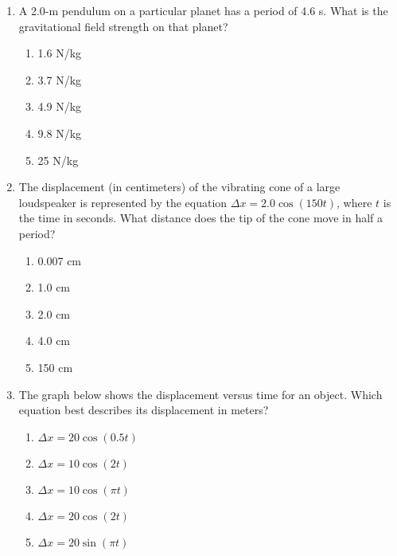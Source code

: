 \documentclass{../../../oss-apphys}
\begin{document}
\begin{multicols}{2}
\begin{enumerate}[leftmargin=18pt]
  \item A 2.0-m pendulum on a particular planet has a period of 4.6 s. What is
    the gravitational field strength on that planet?
    \begin{enumerate}[noitemsep,topsep=0pt,leftmargin=18pt,label=(\Alph*)]
    \item 1.6 N/kg
    \item 3.7 N/kg
    \item 4.9 N/kg
    \item 9.8 N/kg
    \item 25 N/kg
    \end{enumerate}
    \columnbreak
    
  \item The displacement (in centimeters) of the vibrating cone of a large
    loudspeaker is represented by the equation $\Delta x=2.0\cos(150t)$, where
    $t$ is the time in seconds. What distance does the tip of the cone move in
    half a period?
    \begin{enumerate}[noitemsep,topsep=0pt,leftmargin=18pt,label=(\Alph*)]
    \item 0.007 cm
    \item 1.0 cm
    \item 2.0 cm
    \item 4.0 cm
    \item 150 cm
    \end{enumerate}

  \item The graph below shows the displacement versus time for an object. Which
    equation best describes its displacement in meters?\\
    \begin{enumerate}[noitemsep,topsep=0pt,leftmargin=18pt,label=(\Alph*)]
    \item $\Delta x=20\cos(0.5t)$
    \item $\Delta x=10\cos(2t)$
    \item $\Delta x=10\cos(\pi t)$
    \item $\Delta x=20\cos(2t)$
    \item $\Delta x=20\sin(\pi t)$
    \end{enumerate}


\end{enumerate}
\end{multicols}
\end{document}
